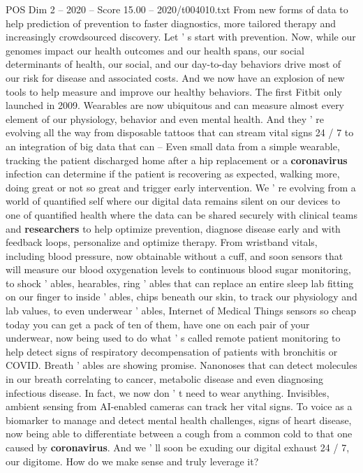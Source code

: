 \begin{textsample}{POS Dim 2 – 2020 – Score 15.00 – 2020/t004010.txt}
From new forms of data to help prediction of prevention to faster diagnostics, more tailored therapy and increasingly crowdsourced discovery.
Let ' s start with prevention.
Now, while our genomes impact our health outcomes and our health spans, our social determinants of health, our social, and our day-to-day behaviors drive most of our risk for disease and associated costs.
And we now have an explosion of new tools to help measure and improve our healthy behaviors.
The first Fitbit only launched in 2009.
Wearables are now ubiquitous and can measure almost every element of our physiology, behavior and even mental health.
And they ' re evolving all the way from disposable tattoos that can stream vital signs 24 / 7 to an integration of big data that can -- Even small data from a simple wearable, tracking the patient discharged home after a hip replacement or a \textbf{coronavirus} infection can determine if the patient is recovering as expected, walking more, doing great or not so great and trigger early intervention.
We ' re evolving from a world of quantified self where our digital data remains silent on our devices to one of quantified health where the data can be shared securely with clinical teams and \textbf{researchers} to help optimize prevention, diagnose disease early and with feedback loops, personalize and optimize therapy.
From wristband vitals, including blood pressure, now obtainable without a cuff, and soon sensors that will measure our blood oxygenation levels to continuous blood sugar monitoring, to shock ' ables, hearables, ring ' ables that can replace an entire sleep lab fitting on our finger to inside ' ables, chips beneath our skin, to track our physiology and lab values, to even underwear ' ables, Internet of Medical Things sensors so cheap today you can get a pack of ten of them, have one on each pair of your underwear, now being used to do what ' s called remote patient monitoring to help detect signs of respiratory decompensation of patients with bronchitis or COVID.
Breath ' ables are showing promise.
Nanonoses that can detect molecules in our breath correlating to cancer, metabolic disease and even diagnosing infectious disease.
In fact, we now don ' t need to wear anything.
Invisibles, ambient sensing from AI-enabled cameras can track her vital signs.
To voice as a biomarker to manage and detect mental health challenges, signs of heart disease, now being able to differentiate between a cough from a common cold to that one caused by \textbf{coronavirus}.
And we ' ll soon be exuding our digital exhaust 24 / 7, our digitome.
How do we make sense and truly leverage it?

\end{textsample}
